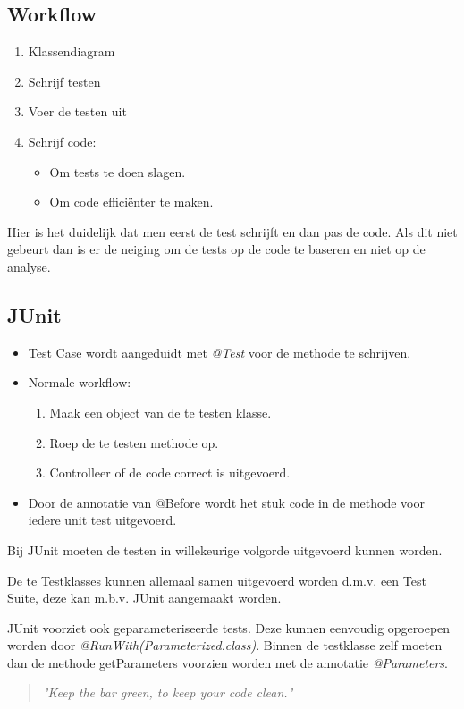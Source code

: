\documentclass[11pt,a4paper]{article}
\begin{document}
\subsection{Workflow}
\begin{enumerate}
	\item Klassendiagram
	\item Schrijf testen
	\item Voer de testen uit
	\item Schrijf code:
	\begin{itemize}
		\item Om tests te doen slagen.
		\item Om code efficiënter te maken.
	\end{itemize}
\end{enumerate}
Hier is het duidelijk dat men eerst de test schrijft en dan pas de code. Als dit niet gebeurt dan is er de neiging om de tests op de code te baseren en niet op de analyse.

\subsection{JUnit}
\begin{itemize}
	\item Test Case wordt aangeduidt met \emph{@Test} 	voor de methode te schrijven.
	\item Normale workflow:
	\begin{enumerate}
		\item Maak een object van de te testen klasse.
		\item Roep de te testen methode op.
		\item Controlleer of de code correct is uitgevoerd.
	\end{enumerate}
	\item Door de annotatie van @Before wordt het stuk code in de methode voor iedere unit test uitgevoerd.
\end{itemize}
Bij JUnit moeten de testen in willekeurige volgorde uitgevoerd kunnen worden.

\noindent
De te Testklasses kunnen allemaal samen uitgevoerd worden d.m.v. een Test Suite, deze kan m.b.v. JUnit aangemaakt worden.

\noindent
JUnit voorziet ook geparameteriseerde tests. Deze kunnen eenvoudig opgeroepen worden door \emph{@RunWith(Parameterized.class)}. Binnen de testklasse zelf moeten dan de methode getParameters voorzien worden met de annotatie \emph{@Parameters}.
\begin{quote}
\textit{"Keep the bar green, to keep your code clean."}
\end{quote}
\end{document}
